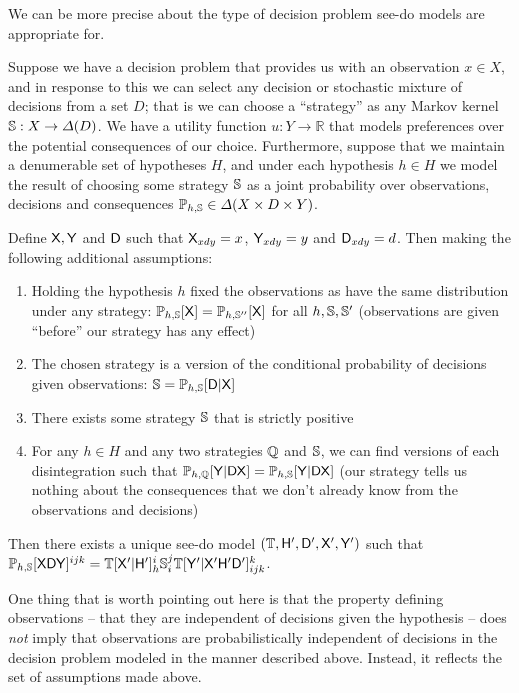 We can be more precise about the type of decision problem see-do models are appropriate for. 
\begin{theorem}
Suppose we have a decision problem that provides us with an observation $x\in X$, and in response to this we can select any decision or stochastic mixture of decisions from a set $D$; that is we can choose a ``strategy'' as any Markov kernel $\mathbb{S}:X\to \Delta(D)$. We have a utility function $u:Y\to \mathbb{R}$ that models preferences over the potential consequences of our choice. Furthermore, suppose that we maintain a denumerable set of hypotheses $H$, and under each hypothesis $h\in H$ we model the result of choosing some strategy $\mathbb{S}$ as a joint probability over observations, decisions and consequences $\mathbb{P}_{h,\mathbb{S}}\in \Delta(X\times D\times Y)$.

Define $\mathsf{X},\mathsf{Y}$ and $\mathsf{D}$ such that $\mathsf{X}_{xdy} = x$, $\mathsf{Y}_{xdy}=y$ and $\mathsf{D}_{xdy} = d$. Then making the following additional assumptions:
\begin{enumerate}
    \item Holding the hypothesis $h$ fixed the observations as have the same distribution under any strategy: $\mathbb{P}_{h,\mathbb{S}}[\mathsf{X}]=\mathbb{P}_{h,\mathbb{S}''}[\mathsf{X}]$ for all $h,\mathbb{S},\mathbb{S}'$ (observations are given ``before'' our strategy has any effect)
    \item The chosen strategy is a version of the conditional probability of decisions given observations: $\mathbb{S}=\mathbb{P}_{h,\mathbb{S}}[\mathsf{D}|\mathsf{X}]$
    \item There exists some strategy $\mathbb{S}$ that is strictly positive
    \item For any $h\in H$ and any two strategies $\mathbb{Q}$ and $\mathbb{S}$, we can find versions of each disintegration such that $\mathbb{P}_{h,\mathbb{Q}}[\mathsf{Y}|\mathsf{D}\mathsf{X}]=\mathbb{P}_{h,\mathbb{S}}[\mathsf{Y}|\mathsf{D}\mathsf{X}]$ (our strategy tells us nothing about the consequences that we don't already know from the observations and decisions)
\end{enumerate}

Then there exists a unique see-do model $(\mathbb{T},\mathsf{H}',\mathsf{D}',\mathsf{X}',\mathsf{Y}')$ such that $\mathbb{P}_{h,\mathbb{S}}[\mathsf{XDY}]^{ijk} = \mathbb{T}[\mathsf{X'}|\mathsf{H'}]_{h}^{i} \mathbb{S}_i^j  \mathbb{T}[\mathsf{Y'}|\mathsf{X'H'D'}]_{ijk}^k$.
\end{theorem}

One thing that is worth pointing out here is that the property defining observations -- that they are independent of decisions given the hypothesis -- does \emph{not} imply that observations are probabilistically independent of decisions in the decision problem modeled in the manner described above. Instead, it reflects the set of assumptions made above.

